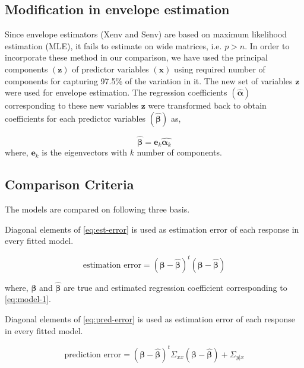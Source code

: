 \documentclass[12pt,3p,authoryear]{elsarticle}
\providecommand{\tightlist}{%
  \setlength{\itemsep}{0pt}\setlength{\parskip}{0pt}}
\begin{document}
\subsection{Modification in envelope
estimation}\label{modification-in-envelope-estimation}

Since envelope estimators (Xenv and Senv) are based on maximum
likelihood estimation (MLE), it fails to estimate on wide matrices, i.e.
\(p > n\). In order to incorporate these method in our comparison, we
have used the principal components \((\mathbf{z})\) of predictor
variables \((\mathbf{x})\) using required number of components for
capturing 97.5\% of the variation in it. The new set of variables
\(\mathbf{z}\) were used for envelope estimation. The regression
coefficients \((\hat{\boldsymbol{\alpha}})\) corresponding to these new
variables \(\mathbf{z}\) were transformed back to obtain coefficients
for each predictor variables \((\boldsymbol{\hat{\beta}})\) as,

\[\hat{\boldsymbol{\beta}} = \mathbf{e}_k\hat{\boldsymbol{\alpha}_k}\]
where, \(\mathbf{e}_k\) is the eigenvectors with \(k\) number of
components.

\subsection{Comparison Criteria}\label{comparison-criteria}

The models are compared on following three basis.

\begin{description}
\tightlist
\item[Estimation Error]
Diagonal elements of \eqref{eq:est-error} is used as estimation error of
each response in every fitted model.

\begin{equation}
  \text{estimation error} = \left(\boldsymbol{\beta} - \boldsymbol{\hat{\beta}}\right)^t\left(\boldsymbol{\beta} - \boldsymbol{\hat{\beta}}\right)
  \label{eq:est-error}
  \end{equation}

where, \(\boldsymbol{\beta}\) and \(\boldsymbol{\hat{\beta}}\) are true
and estimated regression coefficient corresponding to \eqref{eq:model-1}.
\item[Prediction Error]
Diagonal elements of \eqref{eq:pred-error} is used as estimation error of
each response in every fitted model.
\end{description}

\begin{equation}
\text{prediction error} = \left(\boldsymbol{\beta} - \boldsymbol{\hat{\beta}}\right)^t\Sigma_{xx}\left(\boldsymbol{\beta} - \boldsymbol{\hat{\beta}}\right) + \Sigma_{y|x}
\label{eq:pred-error}
\end{equation}
\end{document}
